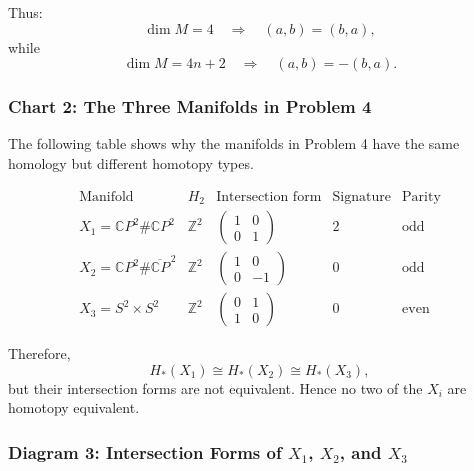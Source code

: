 \documentclass[12pt,a4paper]{article}
\theoremstyle{notespace}
\begin{document}
Thus:
\[
\dim M=4
\quad\Longrightarrow\quad
(a,b)=(b,a),
\]
while
\[
\dim M=4n+2
\quad\Longrightarrow\quad
(a,b)=-(b,a).
\]

\subsubsection{Chart 2: The Three Manifolds in Problem 4}

The following table shows why the manifolds in Problem 4 have the same homology
but different homotopy types.

\[
\begin{array}{c|c|c|c|c}
	\text{Manifold}
	&
	H_2
	&
	\text{Intersection form}
	&
	\text{Signature}
	&
	\text{Parity}
	\\
	\hline
	X_1=\mathbb CP^2\#\mathbb CP^2
	&
	\mathbb Z^2
	&
	\begin{pmatrix}
		1&0\\
		0&1
	\end{pmatrix}
	&
	2
	&
	\text{odd}
	\\[5mm]
	X_2=\mathbb CP^2\#\overline{\mathbb CP}^{\,2}
	&
	\mathbb Z^2
	&
	\begin{pmatrix}
		1&0\\
		0&-1
	\end{pmatrix}
	&
	0
	&
	\text{odd}
	\\[5mm]
	X_3=S^2\times S^2
	&
	\mathbb Z^2
	&
	\begin{pmatrix}
		0&1\\
		1&0
	\end{pmatrix}
	&
	0
	&
	\text{even}
\end{array}
\]

Therefore,
\[
H_*(X_1)\cong H_*(X_2)\cong H_*(X_3),
\]
but their intersection forms are not equivalent. Hence no two of the \(X_i\) are
homotopy equivalent.

\subsubsection{Diagram 3: Intersection Forms of \(X_1\), \(X_2\), and \(X_3\)}
\end{document}
